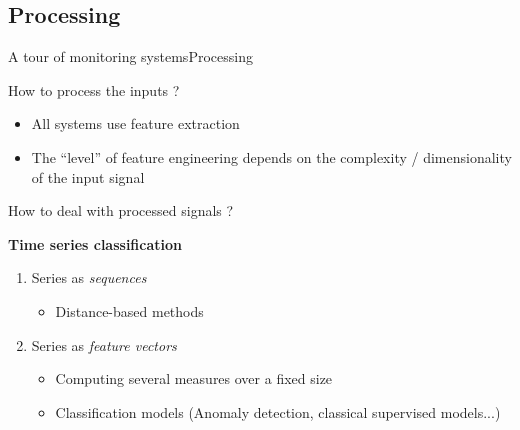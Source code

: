 \documentclass[9pt,t,aspectratio=1610]{beamer}
\begin{document}
\subsection{Processing}
\begin{frame}{A tour of monitoring systems}{Processing}

    \begin{minipage}[t]{0.49\linewidth}
    \vspace{0pt}
    How to process the inputs ?
    \begin{itemize}
        \item All systems use feature extraction
        \item The ``level'' of feature engineering depends on the complexity / dimensionality of the input signal
    \end{itemize}
    How to deal with processed signals ?
    \begin{tcolorbox}[height=4.2cm]
        \textbf{Time series classification}\\[-5pt]
        \begin{enumerate}
            \item Series as \emph{sequences}
            \begin{itemize}
                \item Distance-based methods
            \end{itemize}
            \item Series as \emph{feature vectors}
            \begin{itemize}
                \item Computing several measures over a fixed size
                \item Classification models
                (Anomaly detection, classical supervised models...)
            \end{itemize}
        \end{enumerate}
    \end{tcolorbox}
    \end{minipage}
    \hfill
    \begin{minipage}[t]{0.49\linewidth}
    \vspace{0pt}
        \begin{overprint}

\end{overprint}
\end{minipage}
\end{frame}
\end{document}
